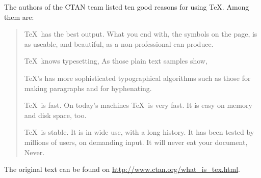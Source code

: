 \documentclass{article}
\begin{document}
The authors of the CTAN team listed ten good reasons for using \TeX. Among them are:
\begin{quotation}
     \TeX\ has the best output. What you end with, the symbols on the page, is as useable, and beautiful, as a non-professional can produce.
    
 \TeX\ knows typesetting, As those plain text samples show, 

\TeX's has more sophisticated typographical algorithms such as those for making paragraphs and for hyphenating.
     
\TeX\ is fast. On today's machines \TeX\ is very fast.
     It is easy on memory and disk space, too.
    
 \TeX\ is stable. It is in wide use, with a long history.
     It has been tested by millions of users, on demanding input.
     It will never eat your document, Never.
\end{quotation}
The original text can be found on
\url{http://www.ctan.org/what_is_tex.html}.
\end{document}
